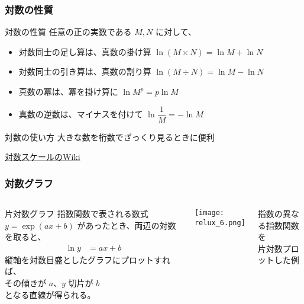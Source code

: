 \documentclass[12pt, dvipdfmx]{beamer}
\begin{document}
\begin{frame}
	\frametitle{対数の性質}
		\begin{block}{対数の性質}
			任意の正の実数である $M,N$ に対して、
			\begin{itemize}
				\item 対数同士の足し算は、真数の掛け算 $\ln (M \times N) = \ln M + \ln N$
				\item 対数同士の引き算は、真数の割り算 $\ln(M \div N) = \ln M - \ln N$
				\item 真数の冪は、冪を掛け算に $\ln M^p = p \ln M$
				\item 真数の逆数は、マイナスを付けて $\ln \dfrac{1}{M} = -\ln M$
			\end{itemize}
		\end{block}
		\begin{exampleblock}{対数の使い方}
			大きな数を桁数でざっくり見るときに便利

			\href{https://ja.wikipedia.org/wiki/対数スケール}{\alert{対数スケールのWiki}}
		\end{exampleblock}
\end{frame}

\begin{frame}
	\frametitle{対数グラフ}
	\begin{columns}[T, onlytextwidth]
			\begin{exampleblock}{片対数グラフ}
				指数関数で表される数式 $y=\exp(ax + b)$ があったとき、両辺の対数を取ると、
					\begin{align*}
						\ln y &= ax  + b
					\end{align*}
				縦軸を対数目盛としたグラフにプロットすれば、\\その傾きが $a$、$y$ 切片が $b$ \\となる直線が得られる。
			\end{exampleblock}
			\vspace{5mm}
			\texttt{[image: relux\_6.png]}

			指数の異なる指数関数を\\片対数プロットした例
	\end{columns}
\end{frame}
\end{document}
